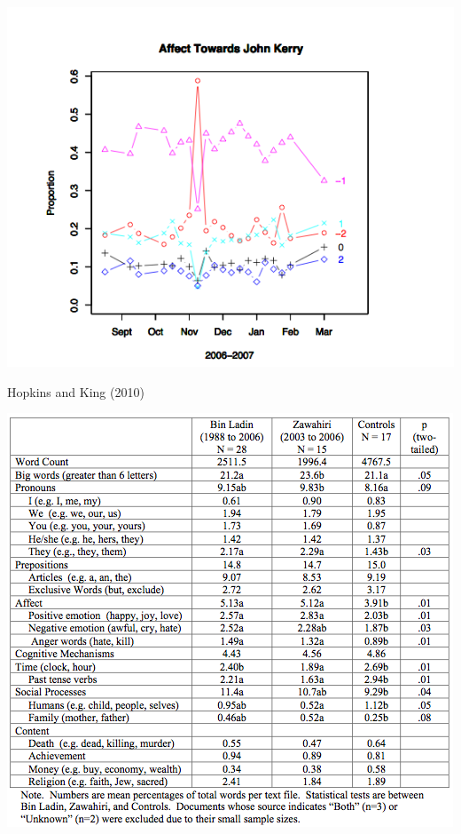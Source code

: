\documentclass{mediumfoils}
\begin{document}

\centerline{\includegraphics[scale=.7]{pictures/kerry-blogs}}
Hopkins and King (2010)


\begin{center}
\includegraphics[scale=.7]{pictures/binladen}
\end{center}
\end{document}
